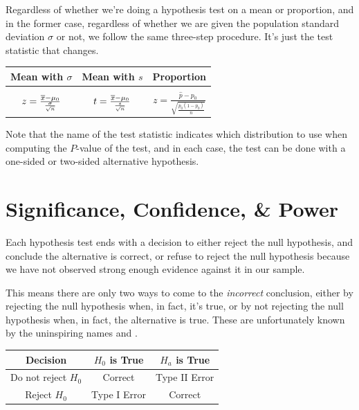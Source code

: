 \begin{keypoint}
Regardless of whether we're doing a hypothesis test on a mean or proportion, and in the former case, regardless of whether we are given the population standard deviation $\sigma$ or not, we follow the same three-step procedure. It's just the test statistic that changes.
\begin{center}
\begin{tabular}{c|c|c}
Mean with $\sigma$ & Mean with $s$ & Proportion  \\ \hline & & \\[-2ex]
$z = \frac{{\overline{x}} - \mu_{0}}{\frac{\sigma}{\sqrt{n}}}$ & $t = \frac{{\overline{x}} - \mu_{0}}{\frac{s}{\sqrt{n}}}$ & $z = \frac{\widehat{p} - p_0}{\sqrt{\frac{p_0(1-p_0)}{n}}}$
\end{tabular}
\end{center}
Note that the name of the test statistic indicates which distribution to use when computing the $P$-value of the test, and in each case, the test can be done with a one-sided or two-sided alternative hypothesis.
\end{keypoint}

\section{Significance, Confidence, \& Power}\label{TestPower}

Each hypothesis test ends with a decision to either reject the null hypothesis, and conclude the alternative is correct, or refuse to reject the null hypothesis because we have not observed strong enough evidence against it in our sample.

This means there are only two ways to come to the \emph{incorrect} conclusion, either by rejecting the null hypothesis when, in fact, it's true, or by not rejecting the null hypothesis when, in fact, the alternative is true. These are unfortunately known by the uninspiring names  and .
\begin{center}
\begin{tabular}{|c|c|c|}
\hline
\textbf{Decision} & \textbf{$H_0$ is True} & \textbf{$H_a$ is True} \\
\hline
Do not reject $H_0$ & Correct & Type II Error \\
\hline
Reject $H_0$ & Type I Error & Correct \\
\hline
\end{tabular}
\end{center}

